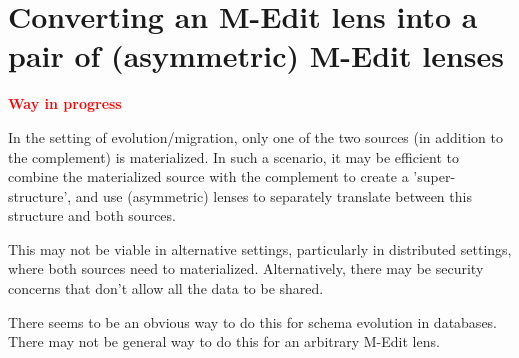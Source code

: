 \documentclass[a4paper,10pt]{article}
\newcommand{\finish}[1]{#1}
\newcommand{\comment}[1]{\finish{\textbf{\textcolor{red}{#1}}}}
\begin{document}
\section{Converting an M-Edit lens into a pair of (asymmetric) M-Edit lenses}
  \comment{Way in progress}

In the setting of evolution/migration, only one of the two sources (in addition to the complement) is materialized. In such a scenario, it may be efficient to combine the materialized source with the complement to create a 'super-structure', and use (asymmetric) lenses to separately translate between this structure and both sources. 

This may not be viable in alternative settings, particularly in distributed settings, where both sources need to materialized. Alternatively, there may be security concerns that don't allow all the data to be shared.

There seems to be an obvious way to do this for schema evolution in databases. There may not be general way to do this for an arbitrary M-Edit lens.
\end{document}
